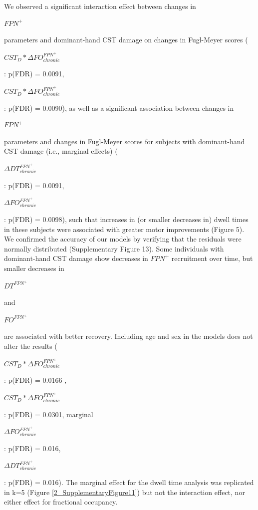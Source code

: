 \documentclass[phd,tocprelim]{cornell}
\begin{document}
    We observed a significant interaction effect between changes in \begin{Large}$FPN^+$\end{Large} parameters and dominant-hand CST damage on changes in Fugl-Meyer scores (\begin{Large}$CST_D *\Delta FO^{FPN^+}_{chronic}$\end{Large}:  p(FDR) = 0.0091, \begin{Large}$CST_D *\Delta FO^{FPN^+}_{chronic}$\end{Large}: p(FDR) = 0.0090), as well as a significant association between changes in \begin{Large}$FPN^+$\end{Large} parameters and changes in Fugl-Meyer scores for subjects with dominant-hand CST damage (i.e., marginal effects) (\begin{Large}$\Delta DT^{FPN^+}_{chronic}$\end{Large}: p(FDR) = 0.0091,  \begin{Large}$\Delta FO^{FPN^+}_{chronic}$\end{Large}: p(FDR) = 0.0098), such that increases in (or smaller decreases in) dwell times in these subjects were associated with greater motor improvements (Figure 5). We confirmed the accuracy of our models by verifying that the residuals were normally distributed (Supplementary Figure 13). Some individuals with dominant-hand CST damage show decreases in $FPN^+$ recruitment over time, but smaller decreases in \begin{Large}$DT^{FPN^+}$\end{Large} and \begin{Large}$FO^{FPN^+}$\end{Large} are associated with better recovery. Including age and sex in the models does not alter the results (\begin{Large}$CST_D *\Delta FO^{FPN^+}_{chronic}$\end{Large}:  p(FDR) = 0.0166 , \begin{Large}$CST_D *\Delta FO^{FPN^+}_{chronic}$\end{Large}: p(FDR) = 0.0301, marginal \begin{Large}$\Delta FO^{FPN^+}_{chronic}$\end{Large}: p(FDR) = 0.016, \begin{Large}$\Delta DT^{FPN^+}_{chronic}$\end{Large}: p(FDR) = 0.016). The marginal effect for the dwell time analysis was replicated in k=5 (Figure \ref{2_SupplementaryFigure11}) but not the interaction effect, nor either effect for fractional occupancy. 
    
\end{document}
